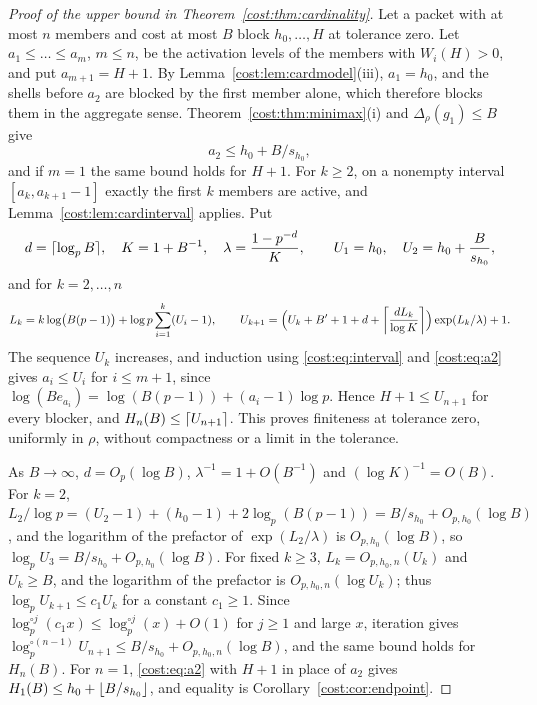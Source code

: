 \begin{proof}[Proof of the upper bound in Theorem~\ref{cost:thm:cardinality}]
Let a packet with at most $n$ members and cost at most $B$ block $h_0,\dots,H$ at tolerance
zero. Let $a_1\le\dots\le a_m$, $m\le n$, be the activation levels of the members with
$W_i(H)>0$, and put $a_{m+1}=H+1$. By Lemma~\ref{cost:lem:cardmodel}(iii), $a_1=h_0$, and the
shells before $a_2$ are blocked by the first member alone, which therefore blocks them in
the aggregate sense. Theorem~\ref{cost:thm:minimax}(i) and $\Delta_\rho(g_1)\le B$ give
\begin{equation}\label{cost:eq:a2}
 a_2\le h_0+B/s_{h_0},
\end{equation}
and if $m=1$ the same bound holds for $H+1$. For $k\ge2$, on a nonempty interval
$[a_k,a_{k+1}-1]$ exactly the first $k$ members are active, and Lemma~\ref{cost:lem:cardinterval}
applies. Put
\[
 d=\ceil{\log_pB},\quad K=1+B^{-1},\quad\lambda=\frac{1-p^{-d}}K,\qquad U_1=h_0,\quad
 U_2=h_0+\frac B{s_{h_0}},
\]
and for $k=2,\dots,n$
\[
 L_k=k\log\bigl(B(p-1)\bigr)+\log p\sum_{i=1}^k(U_i-1),\qquad
 U_{k+1}=\Bigl(U_k+B'+1+d+\ceil*{\frac{dL_k}{\log K}}\Bigr)\exp(L_k/\lambda)+1 .
\]
The sequence $U_k$ increases, and induction using \eqref{cost:eq:interval} and
\eqref{cost:eq:a2} gives $a_i\le U_i$ for $i\le m+1$, since $\log(Be_{a_i})=\log(B(p-1))+(a_i-1)\log p$.
Hence $H+1\le U_{n+1}$ for every blocker, and $H_n(B)\le\ceil{U_{n+1}}$. This proves
finiteness at tolerance zero, uniformly in $\rho$, without compactness or a limit in the
tolerance.

As $B\to\infty$, $d=O_p(\log B)$, $\lambda^{-1}=1+O(B^{-1})$ and $(\log K)^{-1}=O(B)$. For
$k=2$, $L_2/\log p=(U_2-1)+(h_0-1)+2\log_p(B(p-1))=B/s_{h_0}+O_{p,h_0}(\log B)$, and the
logarithm of the prefactor of $\exp(L_2/\lambda)$ is $O_{p,h_0}(\log B)$, so
$\log_pU_3=B/s_{h_0}+O_{p,h_0}(\log B)$. For fixed $k\ge3$, $L_k=O_{p,h_0,n}(U_k)$ and
$U_k\ge B$, and the logarithm of the prefactor is $O_{p,h_0,n}(\log U_k)$; thus
$\log_pU_{k+1}\le c_1U_k$ for a constant $c_1\ge1$. Since
$\log_p^{\circ j}(c_1x)\le\log_p^{\circ j}(x)+O(1)$ for $j\ge1$ and large $x$, iteration
gives $\log_p^{\circ(n-1)}U_{n+1}\le B/s_{h_0}+O_{p,h_0,n}(\log B)$, and the same bound holds
for $H_n(B)$. For $n=1$, \eqref{cost:eq:a2} with $H+1$ in place of $a_2$ gives
$H_1(B)\le h_0+\floor{B/s_{h_0}}$, and equality is Corollary~\ref{cost:cor:endpoint}.
\end{proof}

